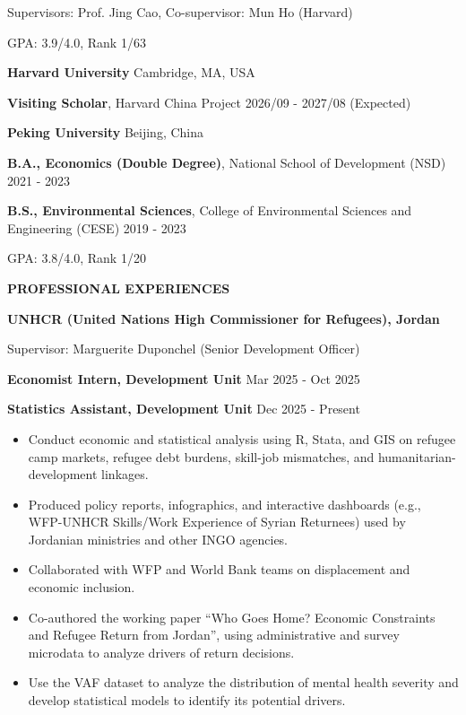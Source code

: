 \documentclass[UTF8]{ctexbook}
\begin{document}
\quad Supervisors: Prof. Jing Cao, Co-supervisor: Mun Ho (Harvard)

\quad GPA: 3.9/4.0, Rank 1/63

\vspace{6pt}

\textbf{Harvard University} \hfill Cambridge, MA, USA

\quad \textbf{Visiting Scholar}, Harvard China Project \hfill 2026/09 - 2027/08 (Expected)

\vspace{12pt}

\textbf{Peking University} \hfill Beijing, China

\quad \textbf{B.A., Economics (Double Degree)}, National School of Development (NSD) \hfill 2021 - 2023

\quad \textbf{B.S., Environmental Sciences}, College of Environmental Sciences and Engineering (CESE) \hfill 2019 - 2023

\quad GPA: 3.8/4.0, Rank 1/20

\vspace{12pt}

\begin{center}
    \textbf{PROFESSIONAL EXPERIENCES}
\end{center}

\textbf{UNHCR (United Nations High Commissioner for Refugees), Jordan}

\quad Supervisor: Marguerite Duponchel (Senior Development Officer)

\quad \textbf{Economist Intern, Development Unit} \hfill Mar 2025 - Oct 2025

\quad \textbf{Statistics Assistant, Development Unit} \hfill Dec 2025 - Present

\begin{itemize}[leftmargin=1.5em, itemsep=2pt, topsep=4pt]
    \item Conduct economic and statistical analysis using R, Stata, and GIS on refugee camp markets, refugee debt burdens, skill-job mismatches, and humanitarian-development linkages.
    \item Produced policy reports, infographics, and interactive dashboards (e.g., WFP-UNHCR Skills/Work Experience of Syrian Returnees) used by Jordanian ministries and other INGO agencies.
    \item Collaborated with WFP and World Bank teams on displacement and economic inclusion.
    \item Co-authored the working paper ``Who Goes Home? Economic Constraints and Refugee Return from Jordan'', using administrative and survey microdata to analyze drivers of return decisions.
    \item Use the VAF dataset to analyze the distribution of mental health severity and develop statistical models to identify its potential drivers.
\end{itemize}
\end{document}
